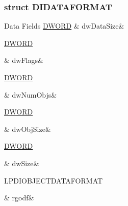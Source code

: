 \subsubsection{struct D\-I\-D\-A\-T\-A\-F\-O\-R\-M\-A\-T}
\begin{DoxyFields}{Data Fields}
\hypertarget{a00003_a6599e7e2ac8527227e1b25a7cf171709}{\hyperlink{a00003_a50e15ae51c87ae06ab29c8148cb5f36c}{D\-W\-O\-R\-D}}\label{a00003_a6599e7e2ac8527227e1b25a7cf171709}
&
dw\-Data\-Size&
\\
\hline

\hypertarget{a00003_a4d2f405b1141000eb2af256e0fc8b98b}{\hyperlink{a00003_a50e15ae51c87ae06ab29c8148cb5f36c}{D\-W\-O\-R\-D}}\label{a00003_a4d2f405b1141000eb2af256e0fc8b98b}
&
dw\-Flags&
\\
\hline

\hypertarget{a00003_a307f0745a69badf462fc4df0760b4118}{\hyperlink{a00003_a50e15ae51c87ae06ab29c8148cb5f36c}{D\-W\-O\-R\-D}}\label{a00003_a307f0745a69badf462fc4df0760b4118}
&
dw\-Num\-Objs&
\\
\hline

\hypertarget{a00003_a4b39937d6980c89cc195792f721409ea}{\hyperlink{a00003_a50e15ae51c87ae06ab29c8148cb5f36c}{D\-W\-O\-R\-D}}\label{a00003_a4b39937d6980c89cc195792f721409ea}
&
dw\-Obj\-Size&
\\
\hline

\hypertarget{a00003_a669c5a85f5a9eb97e64ad880fadaaa2d}{\hyperlink{a00003_a50e15ae51c87ae06ab29c8148cb5f36c}{D\-W\-O\-R\-D}}\label{a00003_a669c5a85f5a9eb97e64ad880fadaaa2d}
&
dw\-Size&
\\
\hline

\hypertarget{a00003_af762c0c7a7aec18a40ac4b24b9d9607e}{L\-P\-D\-I\-O\-B\-J\-E\-C\-T\-D\-A\-T\-A\-F\-O\-R\-M\-A\-T}\label{a00003_af762c0c7a7aec18a40ac4b24b9d9607e}
&
rgodf&
\\
\hline

\end{DoxyFields}
\label{d9/db3/a00066}
\hypertarget{a00003_d9/db3/a00066}{}
